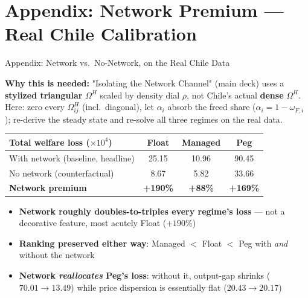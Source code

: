 \section*{Appendix: Network Premium --- Real Chile Calibration}
\begin{frame}{Appendix: Network vs.\ No-Network, on the Real Chile Data}

{\footnotesize \textbf{Why this is needed:} "Isolating the Network Channel" (main deck) uses a \textbf{stylized triangular} $\Omega^H$ scaled by density dial $\rho$, not Chile's actual \textbf{dense} $\Omega^H$. Here: zero every $\Omega^H_{ij}$ (incl.\ diagonal), let $\alpha_i$ absorb the freed share ($\alpha_i=1-\omega_{F,i}$); re-derive the steady state and re-solve all three regimes on the real data.}

\vspace{4pt}
\begin{center}
{\scriptsize
\begin{tabular}{lccc}
\toprule
\textbf{Total welfare loss ($\times10^4$)} & \textbf{Float} & \textbf{Managed} & \textbf{Peg} \\
\midrule
With network (baseline, headline) & 25.15 & 10.96 & 90.45 \\
No network (counterfactual) & 8.67 & 5.82 & 33.66 \\
\midrule
\textbf{Network premium} & \textbf{+190\%} & \textbf{+88\%} & \textbf{+169\%} \\
\bottomrule
\end{tabular}}
\end{center}

\vspace{3pt}
{\footnotesize
\begin{itemize}\setlength{\itemsep}{2pt}
\item \textbf{Network roughly doubles-to-triples every regime's loss} --- not a decorative feature, most acutely Float ($+190\%$)
\item \textbf{Ranking preserved either way}: Managed $<$ Float $<$ Peg with \emph{and} without the network
\item \textbf{Network \emph{reallocates} Peg's loss}: without it, output-gap shrinks ($70.01\to13.49$) while price dispersion is essentially flat ($20.43\to20.17$)
\end{itemize}}

\end{frame}

